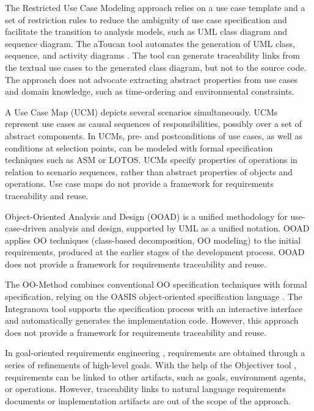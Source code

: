 The Restricted Use Case Modeling approach \cite{62} relies on a use case template and a set of restriction rules to reduce the ambiguity of use case specification and facilitate the transition to analysis models, such as UML class diagram and sequence diagram. The aToucan tool automates the generation of UML class, sequence, and activity diagrams \cite{61}. The tool can generate traceability links from the textual use cases to the generated class diagram, but not to the source code. The approach does not advocate extracting abstract properties from use cases and domain knowledge, such as time-ordering and environmental constraints. 

A Use Case Map (UCM) \cite{3,12} depicts several scenarios simultaneously.
UCMs represent use cases as causal sequences of responsibilities, possibly over a set of abstract components. 
In UCMs, pre- and postconditions of use cases, as well as conditions at selection points, can be modeled with formal specification techniques such as ASM or LOTOS.  
UCMs specify properties of operations in relation to scenario sequences, rather than abstract properties of objects and operations. Use case maps do not provide a framework for requirements traceability and reuse.

Object-Oriented Analysis and Design (OOAD) \cite{8} is a unified methodology for use-case-driven analysis and design, supported by UML \cite{55} as a unified notation. OOAD applies OO techniques (class-based decomposition, OO modeling) to the initial requirements, produced at the earlier stages of the development process. OOAD does not provide a framework for requirements traceability and reuse.

The OO-Method \cite{80} combines conventional OO specification techniques \cite{8} with formal specification, relying on the OASIS object-oriented specification language \cite{lopez1995oasis}. 
The Integranova tool supports the specification process with an interactive interface and automatically generates the implementation code. However, this approach does not provide a framework for requirements traceability and reuse.

In goal-oriented requirements engineering  \cite{78}, \cite{60} requirements are obtained through a series of refinements of high-level goals. With the help of the Objectiver tool \cite{44},
requirements can be linked to other artifacts, such as goals, environment agents, or operations. However, traceability links to natural language requirements documents or implementation artifacts are out of the scope of the approach.

